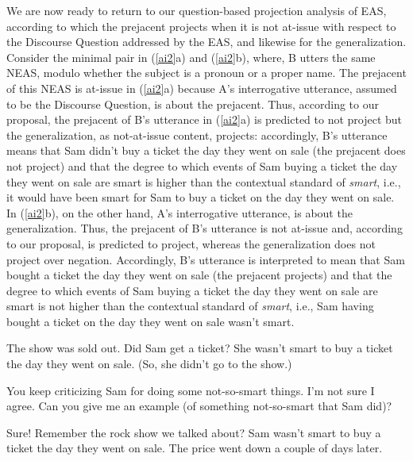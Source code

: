 \documentclass[11pt,fleqn]{article}
\newcommand{\6}{\mbox{$[\hspace*{-.6mm}[$}}
\newcommand{\9}{\mbox{$]\hspace*{-.6mm}]$}}
\begin{document}
We are now ready to return to our question-based projection analysis of EAS, according to which the prejacent projects when it is not at-issue with respect to the Discourse Question addressed by the EAS, and likewise for the generalization. Consider the minimal pair in (\ref{ai2}a) and (\ref{ai2}b), where, B utters the same NEAS, modulo whether the subject is a pronoun or a proper name. The prejacent of this NEAS is at-issue in (\ref{ai2}a) because A's interrogative utterance, assumed to be the Discourse Question, is about the prejacent. Thus, according to our proposal, the prejacent of B's utterance in (\ref{ai2}a) is predicted to not project but the generalization, as not-at-issue content, projects: accordingly, B's utterance means that Sam didn't buy a ticket the day they went on sale (the prejacent does not project) and that the degree to which events of Sam buying a ticket the day they went on sale are smart is higher than the contextual standard of {\em smart}, i.e., it would have been smart for Sam to buy a ticket on the day they went on sale. In (\ref{ai2}b), on the other hand, A's interrogative utterance, is about the generalization. Thus, the prejacent of B's utterance is not at-issue and, according to our proposal, is predicted to project, whereas the generalization does not project over negation. Accordingly, B's utterance is interpreted to mean that Sam bought a ticket the day they went on sale (the prejacent projects) and that the degree to which events of Sam buying a ticket the day they went on sale are smart is not higher than the contextual standard of {\em smart}, i.e., Sam having bought a ticket on the day they went on sale wasn't smart. 


\begin{exe}
\ex\label{ai2}

\begin{xlist}
\ex
\begin{xlist}
 The show was sold out. Did Sam get a ticket?
 She wasn't smart to buy a ticket the day they went on sale. (So, she didn't go to the show.)
\end{xlist}

\ex
\begin{xlist}

 You keep criticizing Sam for doing some not-so-smart things. I'm not sure I agree. Can you give me an example (of something not-so-smart that Sam did)?


 Sure! Remember the rock show we talked about? Sam wasn't smart to buy a ticket the day they went on sale. The price went down a couple of days later.

%

\end{xlist}

\end{xlist}
\end{exe}
\end{document}
